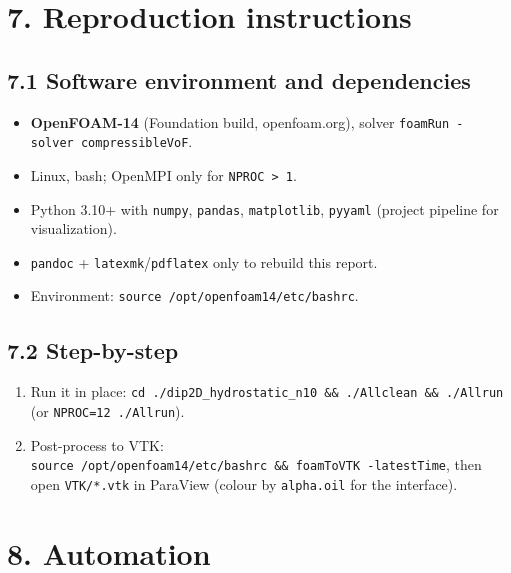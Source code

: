 \documentclass[11pt,english]{article}
\providecommand{\tightlist}{%
  \setlength{\itemsep}{0pt}\setlength{\parskip}{0pt}}
\begin{document}
\section{7. Reproduction instructions}\label{reproduction-instructions}

\subsection{7.1 Software environment and dependencies}\label{software-environment-and-dependencies}

\begin{itemize}
\tightlist
\item
  \textbf{OpenFOAM-14} (Foundation build, openfoam.org), solver
  \texttt{foamRun\ -solver\ compressibleVoF}.
\item
  Linux, bash; OpenMPI only for \texttt{NPROC\ \textgreater{}\ 1}.
\item
  Python 3.10+ with \texttt{numpy}, \texttt{pandas},
  \texttt{matplotlib}, \texttt{pyyaml} (project pipeline for visualization).
\item
  \texttt{pandoc} + \texttt{latexmk}/\texttt{pdflatex} only to rebuild
  this report.
\item
  Environment: \texttt{source\ /opt/openfoam14/etc/bashrc}.
\end{itemize}

\subsection{7.2 Step-by-step}\label{step-by-step}

\begin{enumerate}
\def\labelenumi{\arabic{enumi}.}
\tightlist
\item
  Run it in place:
  \texttt{cd\ ./dip2D\_hydrostatic\_n10\ \&\&\ ./Allclean\ \&\&\ ./Allrun}
  (or \texttt{NPROC=12\ ./Allrun}).
\item
  Post-process to VTK:
  \texttt{source\ /opt/openfoam14/etc/bashrc\ \&\&\ foamToVTK\ -latestTime},
  then open \texttt{VTK/*.vtk} in ParaView (colour by \texttt{alpha.oil}
  for the interface).
\end{enumerate}

\section{8. Automation}\label{automation}
\end{document}
